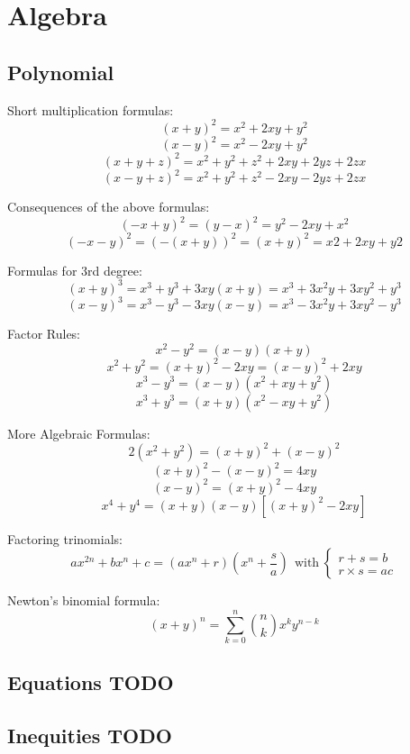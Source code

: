\chapter{Algebra}

\section{Polynomial}
Short multiplication formulas:
$$(x + y)^2 = x^2 + 2xy + y^2$$
$$(x - y)^2 = x^2 - 2xy + y^2$$ 
$$(x + y + z)^2 = x^2 + y^2 + z^2 + 2xy + 2yz + 2zx$$ 
$$(x - y + z)^2 = x^2 + y^2 + z^2 - 2xy - 2yz + 2zx$$ 

Consequences of the above formulas:
$$(-x + y)^2 = (y - x)^2 = y^2 - 2xy + x^2$$
$$(-x - y)^2 = (-(x + y))^2 = (x + y)^2 = x2 + 2xy + y2$$

Formulas for 3rd degree:
$$(x + y)^3 = x^3 + y^3 + 3xy(x + y) = x^3 + 3x^2y + 3xy^2 + y^3$$
$$(x - y)^3 = x^3 - y^3 - 3xy(x - y) = x^3 - 3x^2y + 3xy^2 - y^3$$

Factor Rules:
$$x^2 - y^2 = (x - y)(x + y)$$
$$x^2 + y^2 = (x + y)^2 - 2xy = (x - y)^2 + 2xy$$
$$x^3 - y^3 = (x - y)(x^2 + xy + y^2)$$
$$x^3 + y^3 = (x + y)(x^2 - xy + y^2)$$

More Algebraic Formulas:
$$2(x^2 + y^2) = (x + y)^2 + (x - y)^2$$
$$(x + y)^2 - (x - y)^2 = 4xy$$
$$(x - y)^2 = (x + y)^2 - 4xy$$
$$x^4 + y^4 = (x + y)(x - y)[(x + y)^2 - 2xy]$$

Factoring trinomials:
$$ ax^{2n} + bx^n + c = (ax^n + r)(x^n + \frac{s}{a}) ~~ \text{with} ~ \begin{cases} 
                                                                  r + s = b \\
                                                                  r \times s = ac
                                                                 \end{cases}
$$

Newton's binomial formula:
\[ (x+y)^n = \sum_{k=0}^{n}\binom{n}{k}x^ky^{n-k} \]

\section{Equations TODO}

\section{Inequities TODO}